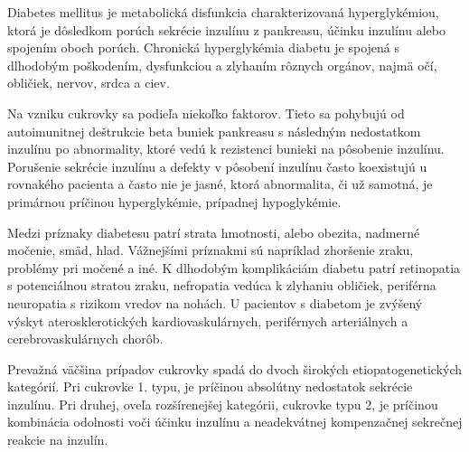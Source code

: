 Diabetes mellitus je metabolická disfunkcia charakterizovaná hyperglykémiou, ktorá je dôsledkom porúch sekrécie inzulínu z pankreasu, účinku inzulínu alebo spojením oboch porúch.\cite{2004}
Chronická hyperglykémia diabetu je spojená s dlhodobým poškodením, dysfunkciou a zlyhaním rôznych orgánov, najmä očí, obličiek, nervov, srdca a ciev.

Na vzniku cukrovky sa podieľa niekoľko faktorov. Tieto sa pohybujú od autoimunitnej deštrukcie beta buniek pankreasu s následným nedostatkom inzulínu po abnormality, ktoré vedú k rezistenci bunieki na pôsobenie inzulínu.
Porušenie sekrécie inzulínu a defekty v pôsobení inzulínu často koexistujú u rovnakého pacienta a často nie je jasné, ktorá abnormalita, či už samotná, je primárnou príčinou hyperglykémie, prípadnej hypoglykémie.\cite{2004}

Medzi príznaky diabetesu patrí strata hmotnosti, alebo obezita, nadmerné močenie, smäd, hlad. Vážnejšími príznakmi sú napríklad zhoršenie zraku, problémy pri močené a iné.
K dlhodobým komplikáciám diabetu patrí retinopatia s potenciálnou stratou zraku, nefropatia vedúca k zlyhaniu obličiek, periférna neuropatia s rizikom vredov na nohách. U pacientov s diabetom je zvýšený výskyt aterosklerotických kardiovaskulárnych, periférnych arteriálnych a cerebrovaskulárnych chorôb.\cite{2004}

Prevažná väčšina prípadov cukrovky spadá do dvoch širokých etiopatogenetických kategórií. Pri cukrovke 1. typu, je príčinou absolútny nedostatok sekrécie inzulínu. Pri druhej, oveľa rozšírenejšej kategórii, cukrovke typu 2, je príčinou kombinácia odolnosti voči účinku inzulínu a neadekvátnej kompenzačnej sekrečnej reakcie na inzulín.\cite{2004}


